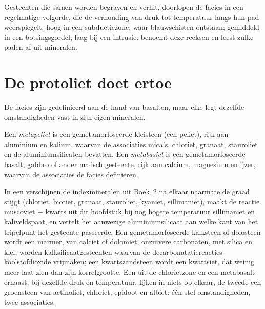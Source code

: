 Gesteenten die samen worden begraven en verhit, doorlopen de facies in een regelmatige volgorde, die
de verhouding van druk tot temperatuur langs hun pad weerspiegelt: hoog in een
subductiezone, waar blauwschisten ontstaan; gemiddeld in een botsingsgordel; laag bij een intrusie.
 benoemt deze reeksen en leest zulke paden af uit mineralen.

\section{De protoliet doet ertoe}\label{sec:b2:metamorphic-facies:protoliths}

De facies zijn gedefinieerd aan de hand van basalten, maar elke  legt dezelfde omstandigheden vast in
zijn eigen mineralen.

\begin{definition}\label{def:b2:metamorphic-facies:protoliths}
Een \emph{metapeliet} is een gemetamorfoseerde kleisteen (een peliet), rijk aan
aluminium en kalium, waarvan de associaties mica's, chloriet, granaat, stauroliet en
de aluminiumsilicaten bevatten. Een \emph{metabasiet} is een gemetamorfoseerde basalt,
gabbro of ander mafisch gesteente, rijk aan calcium, magnesium en ijzer, waarvan de associaties
de facies definiëren.
\end{definition}

In een  verschijnen de indexmineralen uit Boek~2 na elkaar naarmate
de graad stijgt (chloriet, biotiet, granaat, stauroliet, kyaniet, sillimaniet), maakt de
reactie muscoviet + kwarts uit dit hoofdstuk bij nog hogere temperatuur sillimaniet en
kaliveldspaat, en vertelt het aanwezige aluminiumsilicaat aan welke kant van het
tripelpunt het gesteente passeerde. Een gemetamorfoseerde kalksteen of dolosteen wordt een marmer, van calciet of
dolomiet; onzuivere carbonaten, met silica en klei, worden kalksilicaatgesteenten waarvan
de decarbonatatiereacties koolstofdioxide vrijmaken; een kwartszandsteen wordt een kwartsiet,
dat weinig meer laat zien dan zijn korrelgrootte. Een  uit de chlorietzone en een
metabasalt ernaast, bij dezelfde druk en temperatuur, lijken in niets op elkaar, de
tweede een groensteen van actinoliet, chloriet, epidoot en albiet: één stel omstandigheden,
twee associaties.

